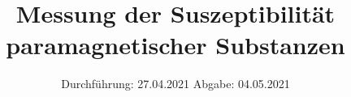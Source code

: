 

\subject{606}
\title{Messung der Suszeptibilität paramagnetischer Substanzen}
\date{%
  Durchführung: 27.04.2021
  \hspace{3em}
  Abgabe: 04.05.2021
}



\maketitle
\thispagestyle{empty}
\tableofcontents
\newpage







\printbibliography{}



